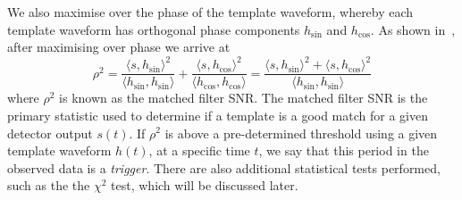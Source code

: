 We also maximise over the phase of the template 
waveform, whereby each template waveform has 
orthogonal phase components $h_{\mathrm{sin}}$ 
and $h_{\mathrm{cos}}$. As shown in~\cite{PhysRevD.85.122006}, after maximising over 
phase we arrive at 
\begin{equation}
    \rho^2 = 
    \frac{\langle s,h_{\mathrm{sin}}\rangle ^2}{\langle h_{\mathrm{sin}},h_{\mathrm{sin}}\rangle } + 
    \frac{\langle s,h_{\mathrm{cos}}\rangle ^2}{\langle h_{\mathrm{cos}},h_{\mathrm{cos}}\rangle } = 
    \frac{\langle s,h_{\mathrm{sin}}\rangle ^2 + \langle s,h_{\mathrm{cos}}\rangle ^2}{\langle h_{\mathrm{sin}},h_{\mathrm{sin}}\rangle }
\end{equation}
where $\rho^2$ is known as the matched filter \ac{SNR}. The matched filter 
\ac{SNR} is the primary statistic used to determine if a template is a good 
match for a given detector output $s(t)$. If $\rho^2$ is above a 
pre-determined threshold using a given template waveform $h(t)$, at a 
specific time $t$, we 
say that this period in the observed data is a \textit{trigger}. There are also 
additional statistical tests performed, such as the the $\chi^2$ test, 
which will be discussed later. 
%
%
%
%
%
